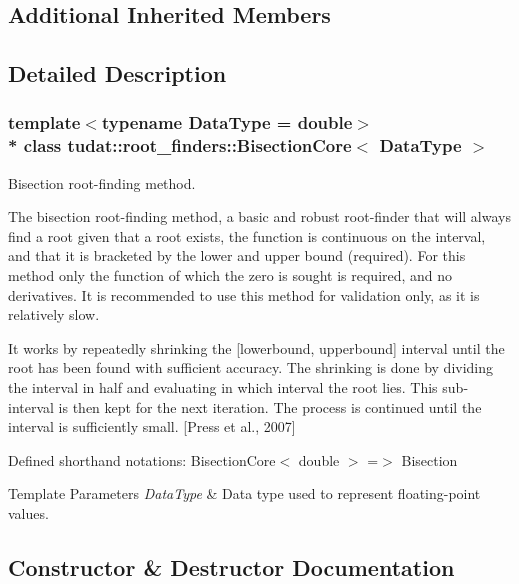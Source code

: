 \subsection*{Additional Inherited Members}


\subsection{Detailed Description}
\subsubsection*{template$<$typename Data\+Type = double$>$\\*
class tudat\+::root\+\_\+finders\+::\+Bisection\+Core$<$ Data\+Type $>$}

Bisection root-\/finding method. 

The bisection root-\/finding method, a basic and robust root-\/finder that will always find a root given that a root exists, the function is continuous on the interval, and that it is bracketed by the lower and upper bound (required). For this method only the function of which the zero is sought is required, and no derivatives. It is recommended to use this method for validation only, as it is relatively slow.

It works by repeatedly shrinking the \mbox{[}lowerbound, upperbound\mbox{]} interval until the root has been found with sufficient accuracy. The shrinking is done by dividing the interval in half and evaluating in which interval the root lies. This sub-\/interval is then kept for the next iteration. The process is continued until the interval is sufficiently small. \mbox{[}Press et al., 2007\mbox{]}

Defined shorthand notations\+: Bisection\+Core$<$ double $>$ =$>$ Bisection


\begin{DoxyTemplParams}{Template Parameters}
{\em Data\+Type} & Data type used to represent floating-\/point values. \\
\hline
\end{DoxyTemplParams}


\subsection{Constructor \& Destructor Documentation}
